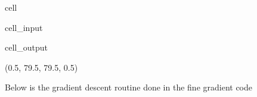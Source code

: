 \documentclass[letterpaper,10pt,english]{jupyterBook}
\begin{document}
\begin{sphinxuseclass}{cell}\begin{sphinxVerbatimInput}

\begin{sphinxuseclass}{cell_input}
\begin{sphinxVerbatim}[commandchars=\\\{\}]
        
\end{sphinxVerbatim}

\end{sphinxuseclass}\end{sphinxVerbatimInput}
\begin{sphinxVerbatimOutput}

\begin{sphinxuseclass}{cell_output}
\begin{sphinxVerbatim}[commandchars=\\\{\}]
(\PYGZhy{}0.5, 79.5, 79.5, \PYGZhy{}0.5)
\end{sphinxVerbatim}

\noindent{}

\end{sphinxuseclass}\end{sphinxVerbatimOutput}

\end{sphinxuseclass}
\sphinxAtStartPar
Below is the gradient descent routine done in the fine gradient code
\end{document}

